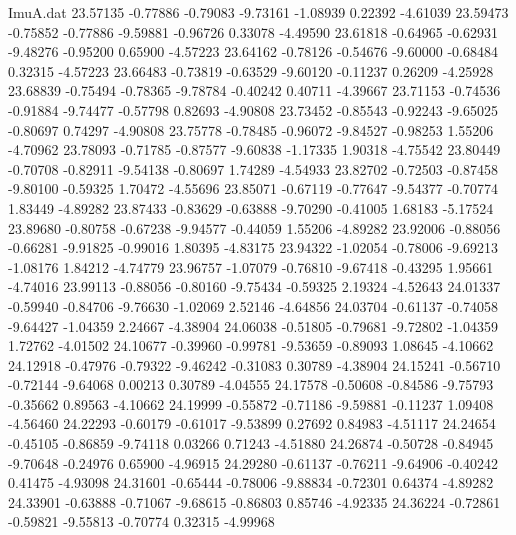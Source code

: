 \begin{filecontents}{ImuA.dat}
  23.57135   -0.77886   -0.79083   -9.73161   -1.08939    0.22392   -4.61039
  23.59473   -0.75852   -0.77886   -9.59881   -0.96726    0.33078   -4.49590
  23.61818   -0.64965   -0.62931   -9.48276   -0.95200    0.65900   -4.57223
  23.64162   -0.78126   -0.54676   -9.60000   -0.68484    0.32315   -4.57223
  23.66483   -0.73819   -0.63529   -9.60120   -0.11237    0.26209   -4.25928
  23.68839   -0.75494   -0.78365   -9.78784   -0.40242    0.40711   -4.39667
  23.71153   -0.74536   -0.91884   -9.74477   -0.57798    0.82693   -4.90808
  23.73452   -0.85543   -0.92243   -9.65025   -0.80697    0.74297   -4.90808
  23.75778   -0.78485   -0.96072   -9.84527   -0.98253    1.55206   -4.70962
  23.78093   -0.71785   -0.87577   -9.60838   -1.17335    1.90318   -4.75542
  23.80449   -0.70708   -0.82911   -9.54138   -0.80697    1.74289   -4.54933
  23.82702   -0.72503   -0.87458   -9.80100   -0.59325    1.70472   -4.55696
  23.85071   -0.67119   -0.77647   -9.54377   -0.70774    1.83449   -4.89282
  23.87433   -0.83629   -0.63888   -9.70290   -0.41005    1.68183   -5.17524
  23.89680   -0.80758   -0.67238   -9.94577   -0.44059    1.55206   -4.89282
  23.92006   -0.88056   -0.66281   -9.91825   -0.99016    1.80395   -4.83175
  23.94322   -1.02054   -0.78006   -9.69213   -1.08176    1.84212   -4.74779
  23.96757   -1.07079   -0.76810   -9.67418   -0.43295    1.95661   -4.74016
  23.99113   -0.88056   -0.80160   -9.75434   -0.59325    2.19324   -4.52643
  24.01337   -0.59940   -0.84706   -9.76630   -1.02069    2.52146   -4.64856
  24.03704   -0.61137   -0.74058   -9.64427   -1.04359    2.24667   -4.38904
  24.06038   -0.51805   -0.79681   -9.72802   -1.04359    1.72762   -4.01502
  24.10677   -0.39960   -0.99781   -9.53659   -0.89093    1.08645   -4.10662
  24.12918   -0.47976   -0.79322   -9.46242   -0.31083    0.30789   -4.38904
  24.15241   -0.56710   -0.72144   -9.64068    0.00213    0.30789   -4.04555
  24.17578   -0.50608   -0.84586   -9.75793   -0.35662    0.89563   -4.10662
  24.19999   -0.55872   -0.71186   -9.59881   -0.11237    1.09408   -4.56460
  24.22293   -0.60179   -0.61017   -9.53899    0.27692    0.84983   -4.51117
  24.24654   -0.45105   -0.86859   -9.74118    0.03266    0.71243   -4.51880
  24.26874   -0.50728   -0.84945   -9.70648   -0.24976    0.65900   -4.96915
  24.29280   -0.61137   -0.76211   -9.64906   -0.40242    0.41475   -4.93098
  24.31601   -0.65444   -0.78006   -9.88834   -0.72301    0.64374   -4.89282
  24.33901   -0.63888   -0.71067   -9.68615   -0.86803    0.85746   -4.92335
  24.36224   -0.72861   -0.59821   -9.55813   -0.70774    0.32315   -4.99968

\end{filecontents}
